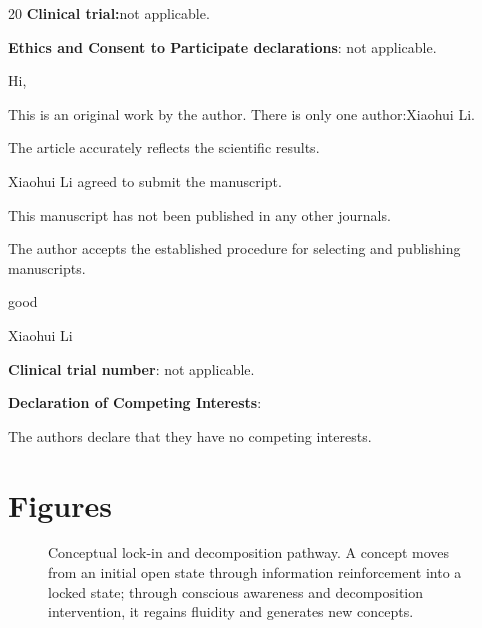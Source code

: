\documentclass[11pt,a4paper]{article}
\begin{document}
\begin{thebibliography}{20}
 \textbf{\textbf{Clinical trial:}}not applicable.

 \textbf{\textbf{Ethics and Consent to Participate declarations}}: not applicable.

 Hi,

This is an original work by the author. There is only one author:Xiaohui Li.

The article accurately reflects the scientific results.

Xiaohui Li agreed to submit the manuscript.

This manuscript has not been published in any other journals.

The author accepts the established procedure for selecting and publishing manuscripts.

good

Xiaohui Li



 \textbf{\textbf{Clinical trial number}}: not applicable.
 
 \textbf{\textbf{Declaration of Competing Interests}}: 

The authors declare that they have no competing interests.

\end{thebibliography}

\newpage

\section*{Figures}

\begin{figure}[htbp]
\centering
{}
\caption{Conceptual lock-in and decomposition pathway. A concept moves from an initial open state through information reinforcement into a locked state; through conscious awareness and decomposition intervention, it regains fluidity and generates new concepts.}
\label{fig:pathway}
\end{figure}
\end{document}
